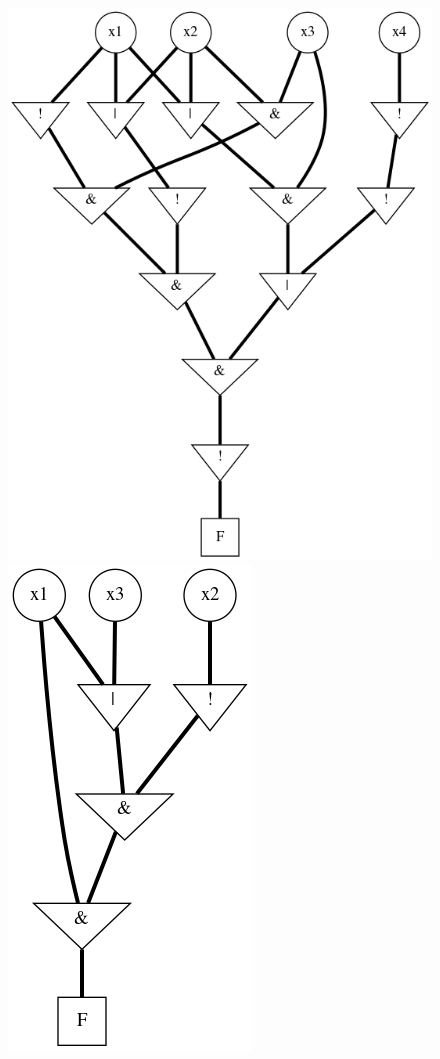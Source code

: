 \documentclass[makeidx, a4paper, 14pt]{extarticle}
\begin{document}
\begin{figure}[H]
    \includegraphics[scale=0.45]{example3.png}
    \includegraphics[scale=0.65]{example2.png}
\end{figure}
\end{document}

